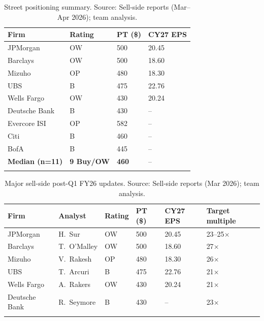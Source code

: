 \documentclass[10pt,letterpaper]{article}
\begin{document}
\begin{table}[!ht]
\centering
\small
{}
\begin{tabular}{p{2.8cm}lp{1.4cm}p{1.4cm}}
\arrayrulecolor{nyuviolet}\toprule
\rowcolor{nyuviolet}\color{white}\textbf{Firm} & \color{white}\textbf{Rating} & \color{white}\textbf{PT (\$)} & \color{white}\textbf{CY27 EPS} \\
\midrule
JPMorgan      & OW  & 500 & 20.45 \\
Barclays      & OW  & 500 & 18.60 \\
Mizuho        & OP  & 480 & 18.30 \\
UBS           & B   & 475 & 22.76 \\
Wells Fargo   & OW  & 430 & 20.24 \\
Deutsche Bank & B   & 430 & --    \\
Evercore ISI  & OP  & 582 & --    \\
Citi          & B   & 460 & --    \\
BofA          & B   & 445 & --    \\
\arrayrulecolor{nyuviolet}\midrule
\textbf{Median (n=11)} & \textbf{9 Buy/OW} & \textbf{460} & -- \\
\arrayrulecolor{nyuviolet}\bottomrule
\end{tabular}
\caption{Street positioning summary. Source: Sell-side reports (Mar--Apr 2026); team analysis.}
\end{table}

\begin{table}[!ht]
\centering
\small
{}
\begin{tabular}{p{3.4cm}p{2.0cm}p{1.6cm}p{2.2cm}p{1.8cm}p{3.4cm}}
\arrayrulecolor{nyuviolet}\toprule
\rowcolor{nyuviolet}\color{white}\textbf{Firm} & \color{white}\textbf{Analyst} & \color{white}\textbf{Rating} & \color{white}\textbf{PT (\$)} & \color{white}\textbf{CY27 EPS} & \color{white}\textbf{Target multiple} \\
\midrule
JPMorgan      & H.\ Sur     & OW & 500 & 20.45 & 23--25$\times$ \\
Barclays      & T.\ O'Malley & OW & 500 & 18.60 & 27$\times$ \\
Mizuho        & V.\ Rakesh   & OP & 480 & 18.30 & 26$\times$ \\
UBS           & T.\ Arcuri   & B  & 475 & 22.76 & 21$\times$ \\
Wells Fargo   & A.\ Rakers   & OW & 430 & 20.24 & 21$\times$ \\
Deutsche Bank & R.\ Seymore  & B  & 430 & --    & 23$\times$ \\
\arrayrulecolor{nyuviolet}\bottomrule
\end{tabular}
\caption{Major sell-side post-Q1 FY26 updates. Source: Sell-side reports (Mar 2026); team analysis.}
\end{table}
\end{document}
